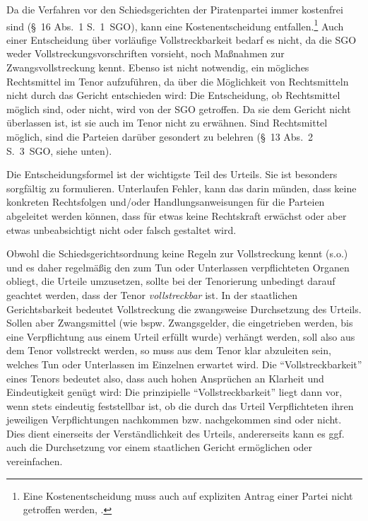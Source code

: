 Da die Verfahren vor den Schiedsgerichten der Piratenpartei immer kostenfrei sind (\S~16 Abs.~1 S.~1~SGO), kann eine Kostenentscheidung entfallen.\footnote{Eine Kostenentscheidung muss auch auf expliziten Antrag einer Partei nicht getroffen werden, \cite{LSGNRW2016001HStreitwert}.}
Auch einer Entscheidung über vorläufige Vollstreckbarkeit bedarf es nicht, da die SGO weder Vollstreckungsvorschriften vorsieht, noch Maßnahmen zur Zwangsvollstreckung kennt.
Ebenso ist nicht notwendig, ein mögliches Rechtsmittel im Tenor aufzuführen, da über die Möglichkeit von Rechtsmitteln nicht durch das Gericht entschieden wird:
Die Entscheidung, ob Rechtsmittel möglich sind, oder nicht, wird von der SGO getroffen.
Da sie dem Gericht nicht überlassen ist, ist sie auch im Tenor nicht zu erwähnen.
Sind Rechtsmittel möglich, sind die Parteien darüber gesondert zu belehren (\S~13 Abs.~2 S.~3~SGO, siehe unten).

Die Entscheidungsformel ist der wichtigste Teil des Urteils.
Sie ist besonders sorgfältig zu formulieren.
Unterlaufen Fehler, kann das darin münden, dass keine konkreten Rechtsfolgen und/oder Handlungsanweisungen für die Parteien abgeleitet werden können, dass für etwas keine Rechtskraft erwächst oder aber etwas unbeabsichtigt nicht oder falsch gestaltet wird.

Obwohl die Schiedsgerichtsordnung keine Regeln zur Vollstreckung kennt (s.o.) und es daher regelmäßig den zum Tun oder Unterlassen verpflichteten Organen obliegt, die Urteile umzusetzen, sollte bei der Tenorierung unbedingt darauf geachtet werden, dass der Tenor \emph{vollstreckbar} ist.
In der staatlichen Gerichtsbarkeit bedeutet Vollstreckung die zwangsweise Durchsetzung des Urteils.
Sollen aber Zwangsmittel (wie bspw. Zwangsgelder, die eingetrieben werden, bis eine Verpflichtung aus einem Urteil erfüllt wurde) verhängt werden, soll also aus dem Tenor vollstreckt werden, so muss aus dem Tenor klar abzuleiten sein, welches Tun oder Unterlassen im Einzelnen erwartet wird.
Die \enquote{Vollstreckbarkeit} eines Tenors bedeutet also, dass auch hohen Ansprüchen an Klarheit und Eindeutigkeit genügt wird:
Die prinzipielle \enquote{Vollstreckbarkeit} liegt dann vor, wenn stets eindeutig feststellbar ist, ob die durch das Urteil Verpflichteten ihren jeweiligen Verpflichtungen nachkommen bzw. nachgekommen sind oder nicht.
Dies dient einerseits der Verständlichkeit des Urteils, andererseits kann es ggf. auch die Durchsetzung vor einem staatlichen Gericht ermöglichen oder vereinfachen.

